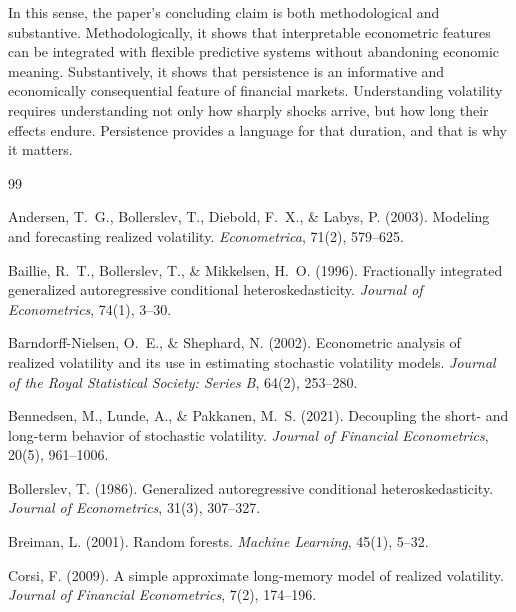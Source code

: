 \documentclass[12pt]{article}
\begin{document}
In this sense, the paper's concluding claim is both methodological and substantive. Methodologically, it shows that interpretable econometric features can be integrated with flexible predictive systems without abandoning economic meaning. Substantively, it shows that persistence is an informative and economically consequential feature of financial markets. Understanding volatility requires understanding not only how sharply shocks arrive, but how long their effects endure. Persistence provides a language for that duration, and that is why it matters.



\begin{thebibliography}{99}

Andersen, T.~G., Bollerslev, T., Diebold, F.~X., \& Labys, P. (2003).
\newblock Modeling and forecasting realized volatility.
\newblock \emph{Econometrica}, 71(2), 579--625.

Baillie, R.~T., Bollerslev, T., \& Mikkelsen, H.~O. (1996).
\newblock Fractionally integrated generalized autoregressive conditional heteroskedasticity.
\newblock \emph{Journal of Econometrics}, 74(1), 3--30.

Barndorff-Nielsen, O.~E., \& Shephard, N. (2002).
\newblock Econometric analysis of realized volatility and its use in estimating stochastic volatility models.
\newblock \emph{Journal of the Royal Statistical Society: Series B}, 64(2), 253--280.

Bennedsen, M., Lunde, A., \& Pakkanen, M.~S. (2021).
\newblock Decoupling the short- and long-term behavior of stochastic volatility.
\newblock \emph{Journal of Financial Econometrics}, 20(5), 961--1006.

Bollerslev, T. (1986).
\newblock Generalized autoregressive conditional heteroskedasticity.
\newblock \emph{Journal of Econometrics}, 31(3), 307--327.

Breiman, L. (2001).
\newblock Random forests.
\newblock \emph{Machine Learning}, 45(1), 5--32.

Corsi, F. (2009).
\newblock A simple approximate long-memory model of realized volatility.
\newblock \emph{Journal of Financial Econometrics}, 7(2), 174--196.


\end{thebibliography}
\end{document}
